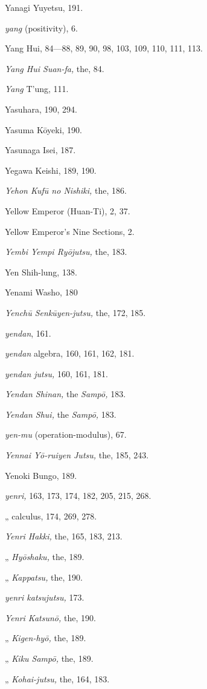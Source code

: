 \documentclass[11pt]{article}
\begin{document}
Yanagi Yuyetsu, 191.\par
\emph{yang} (positivity), 6.\par
Yang Hui, 84---88, 89, 90, 98, 103, 109, 110, 111, 113.\par
\emph{Yang Hui Suan-fa,} the, 84.\par
\emph{Yang} T'ung, 111.\par
Yasuhara, 190, 294.\par
Yasuma Kōyeki, 190.\par
Yasunaga Isei, 187.\par
Yegawa Keishi, 189, 190.\par
\emph{Yehon Kufū no Nishiki,} the, 186.\par
Yellow Emperor (Huan-Ti), 2, 37.\par
Yellow Emperor's Nine Sections, 2.\par
\emph{Yembi Yempi Ryōjutsu,} the, 183.\par
Yen Shih-lung, 138.\par
Yenami Washo, 180\par
\emph{Yenchū Senkūyen-jutsu,} the, 172, 185.\par
\emph{yendan}, 161.\par
\emph{yendan} algebra, 160, 161, 162, 181.\par
\emph{yendan jutsu,} 160, 161, 181.\par
\emph{Yendan Shinan,} the \emph{Sampō,} 183.\par
\emph{Yendan Shui,} the \emph{Sampō,} 183.\par
\emph{yen-mu} (operation-modulus), 67.\par
\emph{Yennai Yō-ruiyen Jutsu,} the, 185, 243.\par
Yenoki Bungo, 189.\par
\emph{yenri,} 163, 173, 174, 182, 205, 215, 268.\par
\quad „ calculus, 174, 269, 278.\par
\emph{Yenri Hakki,} the, 165, 183, 213.\par
\quad „ \emph{Hyōshaku,} the, 189.\par
\quad „ \emph{Kappatsu,} the, 190.\par
\emph{yenri katsujutsu,} 173.\par
\emph{Yenri Katsunō,} the, 190.\par
\quad „ \emph{Kigen-hyō,} the, 189.\par
\quad „ \emph{Kiku Sampō,} the, 189.\par
\quad „ \emph{Kohai-jutsu,} the, 164, 183.\par
\end{document}
